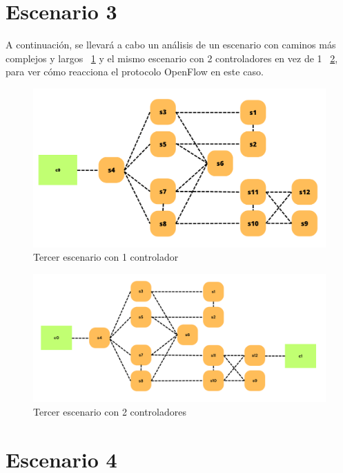 \documentclass[a4paper, 12pt]{book}
\begin{document}
 	\section{Escenario 3}
 	
 	A continuación, se llevará a cabo un análisis de un escenario con caminos más complejos y largos ~\ref{figura:b4_1} y el mismo escenario con 2 controladores en vez de 1 ~\ref{figura:b4_2}, para ver cómo reacciona el protocolo OpenFlow en este caso.
 	
 	\begin{figure}[H]
 		\centering
 		\includegraphics[width=16cm, keepaspectratio]{img/b4_1}
 		\caption{Tercer escenario con 1 controlador}
 		\label{figura:b4_1}
 	\end{figure}
 	
 	\begin{figure}[H]
 		\centering
 		\includegraphics[width=16cm, keepaspectratio]{img/b4_2}
 		\caption{Tercer escenario con 2 controladores}
 		\label{figura:b4_2}
 	\end{figure}
	
	
	\section{Escenario 4}
	
\end{document}
